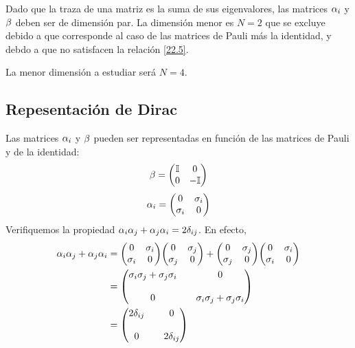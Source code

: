 Dado que la traza de una matriz es la suma de sus eigenvalores, las matrices $\alpha_i$ y $\beta$ deben ser de dimensión par. La dimensión menor es $N=2$ que se excluye debido a que corresponde al caso de las matrices de Pauli más la identidad, y debdo a que no satisfacen la relación \eqref{22.5}.

La menor dimensión a estudiar será $N=4$.

\subsection{Repesentación de Dirac}
Las matrices $\alpha_i$ y $\beta$ pueden ser representadas en función de las matrices de Pauli y de la identidad:
\begin{equation}
  \b =\mqty(\id&0\\
  0&-\id )
\end{equation}
\begin{equation}
  \a_i=\mqty(0&\s_i\\
  \s_i&0)
\end{equation}
Verifiquemos la propiedad $\alpha_i\alpha_j+\alpha_j\alpha_i=2\delta_{ij}$. En efecto,
\begin{align}
  \a_i\a_j+\a_j\a_i&=\mqty(0&\s_i\\\s_i&0)\mqty(0&\s_j\\\s_j&0)+\mqty(0&\s_j\\\s_j&0)\mqty(0&\s_i\\\s_i&0)\\
  &=\mqty(\s_i\s_j+\s_j\s_i&&0\\\\0&&\s_i\s_j+\s_j\s_i)\\
  &=\mqty(2\d_{ij}&&0\\\\0&&2\d_{ij})
\end{align}




























































